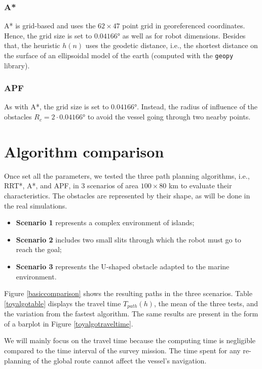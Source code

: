 \subsubsection{A*}
A* is grid-based and uses the $62\times47$ point grid in georeferenced coordinates. Hence, the grid size is set to $0.04166$° as well as for robot dimensions. Besides that, the heuristic $h(n)$ uses the geodetic distance, i.e., the shortest distance on the surface of an ellipsoidal model of the earth (computed with the \texttt{geopy} library).
\subsubsection{APF}
As with A*, the grid size is set to $0.04166$°. Instead, the radius of influence of the obstacles $R_c=2\cdot0.04166$° to avoid the vessel going through two nearby points.

\section{Algorithm comparison}
Once set all the parameters, we tested the three path planning algorithms, i.e., RRT*, A*, and APF, in 3 scenarios of area $100\times80$ km to evaluate their characteristics. The obstacles are represented by their shape, as will be done in the real simulations. 
\begin{itemize}[itemsep=0pt]
	\item \textbf{Scenario 1} represents a complex environment of islands;
	\item \textbf{Scenario 2} includes two small slits through which the robot must go to reach the goal;
	\item \textbf{Scenario 3} represents the U-shaped obstacle adapted to the marine environment.
\end{itemize} 

Figure \ref{basiccomparison} shows the resulting paths in the three scenarios. Table \ref{toyalgotable} displays the travel time $T_{path}(h)$, the mean of the three tests, and the variation from the fastest algorithm. The same results are present in the form of a barplot in Figure \ref{toyalgotraveltime}. 

We will mainly focus on the travel time because the computing time is negligible compared to the time interval of the survey mission. The time spent for any re-planning of the global route cannot affect the vessel's navigation.


